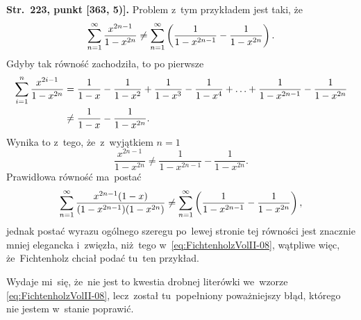 \documentclass[a4paper,11pt]{article}
\begin{document}
\start \textbf{Str.~223, punkt [363, 5)].} Problem z~tym przykładem
jest taki, że
\begin{equation}
  \label{eq:FichtenholzVolII-08}
  \sum\limits_{ n = 1 }^{ \infty } \frac{ x^{ 2n - 1 } }{ 1 - x^{ 2n } }
  \neq \sum\limits_{ n = 1 }^{ \infty } \left( \frac{ 1 }{ 1 - x^{ 2n - 1 } }
    - \frac{ 1 }{ 1 - x^{ 2n } } \right).
\end{equation}
Gdyby tak równość zachodziła, to po pierwsze
\begin{equation}
  \label{eq:FichtenholzVolII-09}
  \begin{split}
    \sum\limits_{ i = 1 }^{ n } \frac{ x^{ 2i - 1 } }{ 1 - x^{ 2n } } &=
    \frac{ 1 }{ 1 - x } - \frac{ 1 }{ 1 - x^{ 2 } } + \frac{ 1 }{ 1 -
      x^{ 3 } } - \frac{ 1 }{ 1 - x^{ 4 } }
    + \ldots + \frac{ 1 }{ 1 - x^{ 2n - 1 } } - \frac{ 1 }{ 1 - x^{ 2n } } \\
    &\neq \frac{ 1 }{ 1 - x } - \frac{ 1 }{ 1 - x^{ 2n } }.
  \end{split}
\end{equation}
Wynika to z~tego, że~z~wyjątkiem $n = 1$
\begin{equation}
  \label{eq:FichtenholzVolII-10}
  \frac{ x^{ 2n - 1 } }{ 1 - x^{ 2n } }
  \neq \frac{ 1 }{ 1 - x^{ 2n - 1 } } - \frac{ 1 }{ 1 - x^{ 2n } }.
\end{equation}
Prawidłowa równość ma~postać
\begin{equation}
  \label{eq:FichtenholzVolII-11}
  \sum\limits_{ n = 1 }^{ \infty } \frac{ x^{ 2n - 1 } ( 1 - x ) }{ ( 1 - x^{ 2n - 1 } )
    ( 1 - x^{ 2n } ) }
  \neq \sum\limits_{ n = 1 }^{ \infty } \left( \frac{ 1 }{ 1 - x^{ 2n - 1 } }
    - \frac{ 1 }{ 1 - x^{ 2n } } \right),
\end{equation}
jednak postać wyrazu ogólnego szeregu po~lewej stronie tej równości
jest znacznie mniej elegancka i~zwięzła, niż~tego
w~\eqref{eq:FichtenholzVolII-08}, wątpliwe więc, że~Fichtenholz chciał
podać tu~ten przykład.

Wydaje mi~się, że~nie jest to kwestia drobnej literówki we~wzorze
\eqref{eq:FichtenholzVolII-08}, lecz~został tu~popełniony poważniejszy
błąd, którego nie jestem w~stanie poprawić.

\vspace{\spaceFour}
\end{document}
